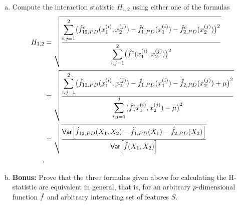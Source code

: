 {\begin{enumerate}[a)]
    \item Compute the interaction statistic $H_{1,2}$ using either one of the formulas
    \[
    \begin{aligned}
        H_{1,2}
        & = \sqrt{
            \frac{\displaystyle
                \sum_{i,j = 1}^2 \bigl(
                \hat{f}^c_{12,PD}(x_1^{(i)},x_2^{(j)})-
                \hat{f}^c_{1,PD}(x_1^{(i)})-
                \hat{f}^c_{2,PD}(x_2^{(j)})
                \bigr)^2
            }{\displaystyle
                \sum_{i,j = 1}^2 \bigl(
                \hat{f}^c(x_1^{(i)},x_2^{(j)})
                \bigr)^2
            }
        } \\
        & = \sqrt{
            \frac{\displaystyle
                \sum_{i,j = 1}^2 \bigl(
                \hat{f}_{12,PD}(x_1^{(i)},x_2^{(j)})-
                \hat{f}_{1,PD}(x_1^{(i)})-
                \hat{f}_{2,PD}(x_2^{(j)})+\mu
                \bigr)^2
            }{\displaystyle
                \sum_{i,j = 1}^2 \bigl(
                \hat{f}(x_1^{(i)},x_2^{(j)})-\mu
                \bigr)^2
            }
        } \\
        & = \sqrt{
            \frac{\mathsf{Var} \Bigl[
                \hat{f}_{12,PD}(X_1, X_2)-
                \hat{f}_{1,PD}(X_1)-
                \hat{f}_{2,PD}(X_2)
                \Bigr]
            }{\mathsf{Var} \Bigl[
                \hat{f}( X_1, X_2 )
                \Bigr]
            }
        } \\.  
    \end{aligned}
    \]

    \item \textbf{Bonus:} Prove that the three formulas given above for calculating the H-statistic are equivalent in general, that is, for an arbitrary $p$-dimensional function $\hat{f}$ and arbitrary interacting set of features $S$.
    
\end{enumerate}

}